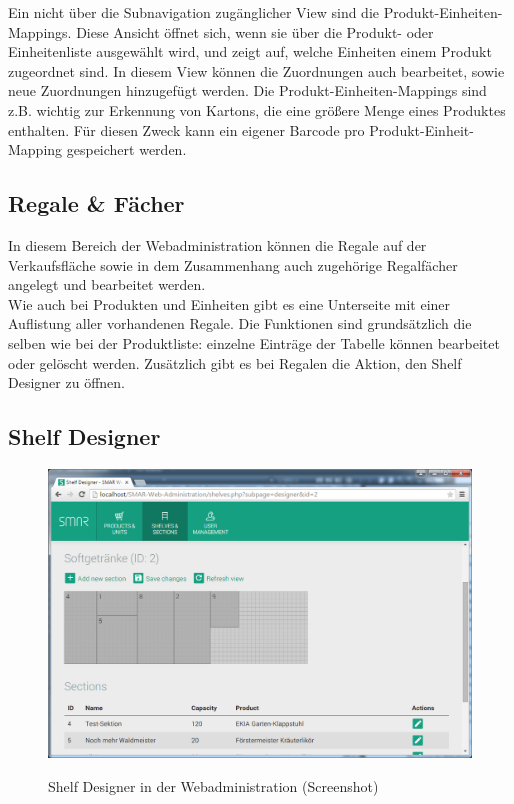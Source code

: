 Ein nicht über die Subnavigation zugänglicher View sind die Produkt-Einheiten-Mappings. Diese Ansicht öffnet sich, wenn sie über die Produkt- oder Einheitenliste ausgewählt wird, und zeigt auf, welche Einheiten einem Produkt zugeordnet sind. In diesem View können die Zuordnungen auch bearbeitet, sowie neue Zuordnungen hinzugefügt werden. Die Produkt-Einheiten-Mappings sind z.B. wichtig zur Erkennung von Kartons, die eine größere Menge eines Produktes enthalten. Für diesen Zweck kann ein eigener Barcode pro Produkt-Einheit-Mapping gespeichert werden.


\subsection{Regale \& Fächer}

In diesem Bereich der Webadministration können die Regale auf der Verkaufsfläche sowie in dem Zusammenhang auch zugehörige Regalfächer angelegt und bearbeitet werden.\\

Wie auch bei Produkten und Einheiten gibt es eine Unterseite mit einer Auflistung aller vorhandenen Regale. Die Funktionen sind grundsätzlich die selben wie bei der Produktliste: einzelne Einträge der Tabelle können bearbeitet oder gelöscht werden. Zusätzlich gibt es bei Regalen die Aktion, den Shelf Designer zu öffnen.\\




\subsection{Shelf Designer}

\begin{figure}[H]
	\centering
	{\includegraphics[width=\textwidth]{Bilder/Abbildungen/webadmin_shelves_designer.png}}
	\caption{Shelf Designer in der Webadministration (Screenshot)}
	\label{fig:webadmin_shelves_designer}
\end{figure}

